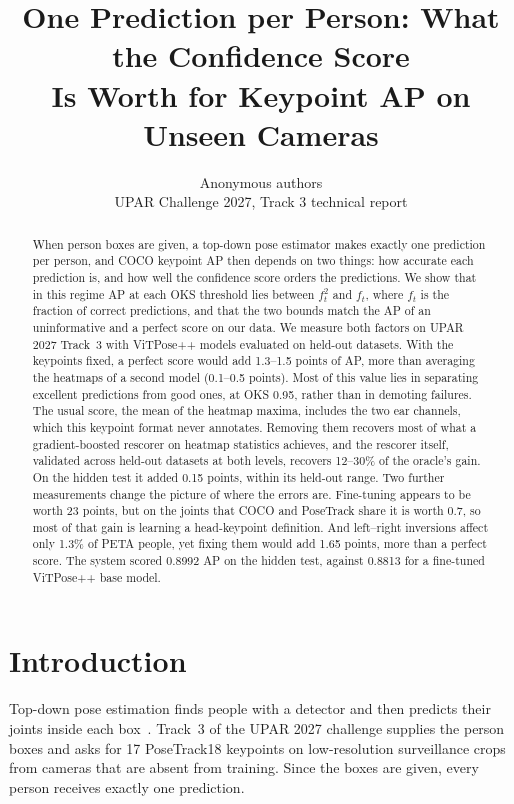 \documentclass[10pt,twocolumn,letterpaper]{article}
\title{\Large\bf One Prediction per Person: What the Confidence Score\\ Is Worth for Keypoint AP on Unseen Cameras}
\author{Anonymous authors\\ UPAR Challenge 2027, Track 3 technical report}
\date{}
\begin{document}
\maketitle

\begin{abstract}
When person boxes are given, a top-down pose estimator makes exactly one prediction per person, and COCO keypoint AP then depends on two things: how accurate each prediction is, and how well the confidence score orders the predictions. We show that in this regime AP at each OKS threshold lies between $f_t^2$ and $f_t$, where $f_t$ is the fraction of correct predictions, and that the two bounds match the AP of an uninformative and a perfect score on our data. We measure both factors on UPAR 2027 Track~3 with ViTPose++ models evaluated on held-out datasets. With the keypoints fixed, a perfect score would add 1.3--1.5 points of AP, more than averaging the heatmaps of a second model (0.1--0.5 points). Most of this value lies in separating excellent predictions from good ones, at OKS 0.95, rather than in demoting failures. The usual score, the mean of the heatmap maxima, includes the two ear channels, which this keypoint format never annotates. Removing them recovers most of what a gradient-boosted rescorer on heatmap statistics achieves, and the rescorer itself, validated across held-out datasets at both levels, recovers 12--30\% of the oracle's gain. On the hidden test it added 0.15 points, within its held-out range. Two further measurements change the picture of where the errors are. Fine-tuning appears to be worth 23 points, but on the joints that COCO and PoseTrack share it is worth 0.7, so most of that gain is learning a head-keypoint definition. And left--right inversions affect only 1.3\% of PETA people, yet fixing them would add 1.65 points, more than a perfect score. The system scored 0.8992 AP on the hidden test, against 0.8813 for a fine-tuned ViTPose++ base model.
\end{abstract}

\section{Introduction}

Top-down pose estimation finds people with a detector and then predicts their joints inside each box~\cite{simplebaseline,hrnet,vitpose}. Track~3 of the UPAR 2027 challenge supplies the person boxes and asks for 17 PoseTrack18 keypoints on low-resolution surveillance crops from cameras that are absent from training. Since the boxes are given, every person receives exactly one prediction.
\end{document}

